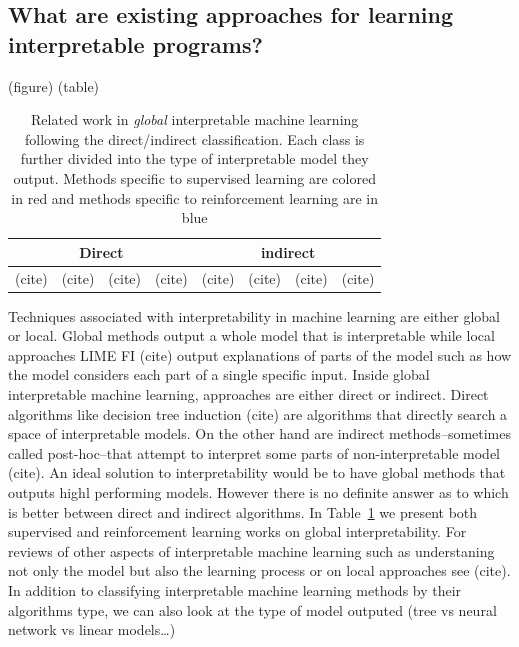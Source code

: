 \subsection{What are existing approaches for learning interpretable programs?}
(figure)%
(table)
\begin{table}
    \centering
    \caption{Related work in \textit{global} interpretable machine learning following the direct/indirect classification. Each class is further divided into the type of interpretable model they output. Methods specific to supervised learning are colored in {\color{red} red} and methods specific to reinforcement learning are in {\color{blue} blue}}\label{tab:related-work}
    \begin{tabular}{|cccc|cccc|}
        \toprule
        \multicolumn{4}{|c|}{\textbf{Direct}} &
        \multicolumn{4}{|c|}{\textbf{indirect}} \\
        \midrule
        (cite) &(cite) &(cite) &(cite) &(cite) &(cite) &(cite) &(cite) \\
    \end{tabular}
\end{table}
Techniques associated with interpretability in machine learning are either global or local. Global methods output a whole model that is interpretable while local approaches LIME FI (cite) output explanations of parts of the model such as how the model considers each part of a single specific input. Inside global interpretable machine learning, approaches are either direct or indirect. Direct algorithms like decision tree induction (cite) are algorithms that directly search a space of interpretable models. On the other hand are indirect methods--sometimes called post-hoc--that attempt to interpret some parts of non-interpretable model (cite).
An ideal solution to interpretability would be to have global methods that outputs highl performing models. However there is no definite answer as to which is better between direct and indirect algorithms.
In Table~\ref{tab:related-work} we present both supervised and reinforcement learning works on global interpretability. For reviews of other aspects of interpretable machine learning such as understaning not only the model but also the learning process or on local approaches see (cite). 
In addition to classifying interpretable machine learning methods by their algorithms type, we can also look at the type of model outputed (tree vs neural network vs linear models\dots) 


